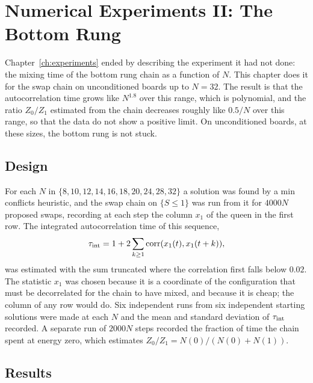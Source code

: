 \chapter{Numerical Experiments II: The Bottom Rung}
\label{ch:experiments2}

Chapter~\ref{ch:experiments} ended by describing the experiment it had not done: the mixing time of the bottom rung chain as a function of $N$. This chapter does it for the swap chain on unconditioned boards up to $N = 32$. The result is that the autocorrelation time grows like $N^{1.8}$ over this range, which is polynomial, and the ratio $Z_0 / Z_1$ estimated from the chain decreases roughly like $0.5/N$ over this range, so that the data do not show a positive limit. On unconditioned boards, at these sizes, the bottom rung is not stuck.

\section{Design}

For each $N$ in $\{ 8, 10, 12, 14, 16, 18, 20, 24, 28, 32 \}$ a solution was found by a min conflicts heuristic, and the swap chain on $\{ S \le 1 \}$ was run from it for $4000 N$ proposed swaps, recording at each step the column $x_1$ of the queen in the first row. The integrated autocorrelation time of this sequence,
\[
\tau_{\rm int} = 1 + 2 \sum_{k \ge 1} \mathrm{corr}(x_1(t), x_1(t + k)) ,
\]
was estimated with the sum truncated where the correlation first falls below $0.02$. The statistic $x_1$ was chosen because it is a coordinate of the configuration that must be decorrelated for the chain to have mixed, and because it is cheap; the column of any row would do. Six independent runs from six independent starting solutions were made at each $N$ and the mean and standard deviation of $\tau_{\rm int}$ recorded. A separate run of $2000 N$ steps recorded the fraction of time the chain spent at energy zero, which estimates $Z_0 / Z_1 = N(0) / (N(0) + N(1))$.

\section{Results}

